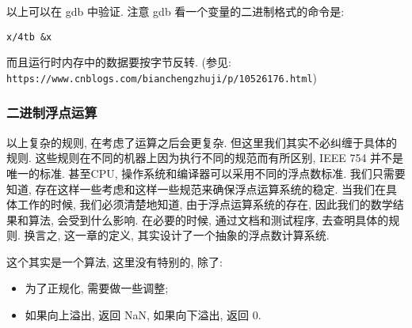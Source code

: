\documentclass[a4paper]{ctexart}
\begin{document}
{以上可以在 gdb 中验证. 注意 gdb 看一个变量的二进制格式的命令是:
\begin{verbatim}
x/4tb &x
\end{verbatim}
而且运行时内存中的数据要按字节反转.
(参见: \newline
\verb|https://www.cnblogs.com/bianchengzhuji/p/10526176.html|)

\subsubsection{二进制浮点运算}
以上复杂的规则, 在考虑了运算之后会更复杂. 但这里我们其实不必纠缠于具体的规则.
这些规则在不同的机器上因为执行不同的规范而有所区别, IEEE 754 并不是唯一的标准.
甚至CPU, 操作系统和编译器可以采用不同的浮点数标准. 
我们只需要知道, 存在这样一些考虑和这样一些规范来确保浮点运算系统的稳定.
当我们在具体工作的时候, 我们必须清楚地知道, 由于浮点运算系统的存在,
因此我们的数学结果和算法, 会受到什么影响. 在必要的时候, 通过文档和测试程序,
去查明具体的规则. 换言之, 这一章的定义, 其实设计了一个抽象的浮点数计算系统.



 这个其实是一个算法, 
这里没有特别的, 除了:
\begin{itemize}
\item 为了正规化, 需要做一些调整;
\item 如果向上溢出, 返回 NaN, 如果向下溢出, 返回 $0$.
\end{itemize}

}
\end{document}
